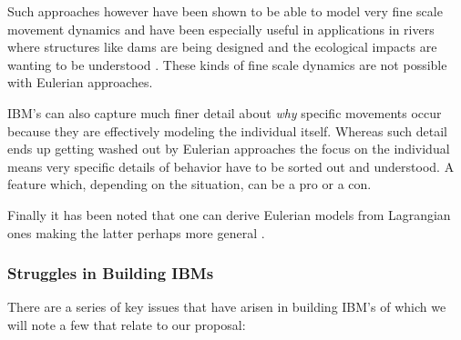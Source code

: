 \documentclass[11pt]{article}
\begin{document}
Such approaches however have been shown to be able to model very fine scale movement dynamics and have been especially useful in applications in rivers where structures like dams are being designed and the ecological impacts are wanting to be understood \citep{goodwin2006} \citep{grimm}. These kinds of fine scale dynamics are not possible with Eulerian approaches. 

IBM's can also capture much finer detail about \textit{why} specific movements occur because they are effectively modeling the individual itself. Whereas such detail ends up getting washed out by Eulerian approaches the focus on the individual means very specific details of behavior have to be sorted out and understood. A feature which, depending on the situation, can be a pro or a con. 

Finally it has been noted that one can derive Eulerian models from Lagrangian ones making the latter perhaps more general \citep{phillipsa2018}. \newline

\subsubsection{Struggles in Building IBMs}

There are a series of key issues \citep{grimm} that have arisen in building IBM's of which we will note a few that relate to our proposal:
\end{document}
